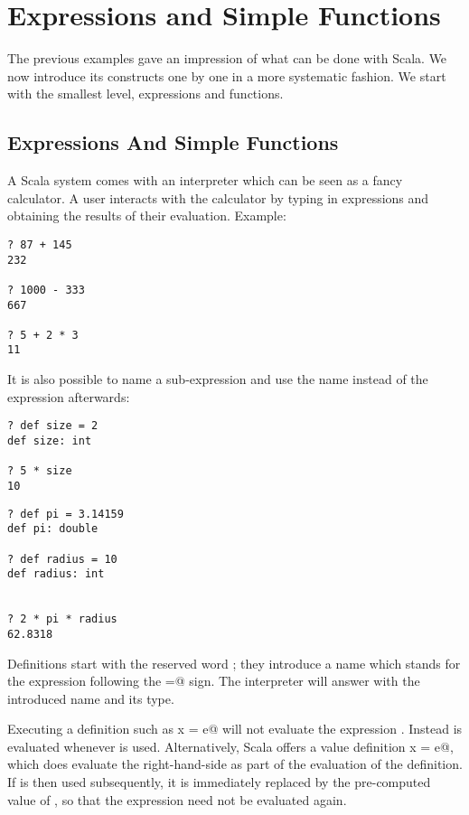 \documentclass[11pt]{book}
\begin{document}
\chapter{\label{chap:simple-funs}Expressions and Simple Functions}

The previous examples gave an impression of what can be done with
Scala.  We now introduce its constructs one by one in a more
systematic fashion. We start with the smallest level, expressions and
functions.

\section{Expressions And Simple Functions}

A Scala system comes with an interpreter which can be seen as a
fancy calculator. A user interacts with the calculator by typing in
expressions and obtaining the results of their evaluation. Example:

\begin{verbatim}
? 87 + 145
232

? 1000 - 333
667

? 5 + 2 * 3
11
\end{verbatim}
It is also possible to name a sub-expression and use the name instead
of the expression afterwards:
\begin{verbatim}
? def size = 2
def size: int

? 5 * size
10
\end{verbatim}
\begin{verbatim}
? def pi = 3.14159
def pi: double

? def radius = 10
def radius: int


? 2 * pi * radius
62.8318
\end{verbatim}
Definitions start with the reserved word \verb@def@; they introduce a
name which stands for the expression following the \verb@=@ sign.  The
interpreter will answer with the introduced name and its type.

Executing a definition such as \verb@def x = e@ will not evaluate the
expression \verb@e@.  Instead \verb@e@ is evaluated whenever \verb@x@
is used. Alternatively, Scala offers a value definition 
\verb@val x = e@, which does evaluate the right-hand-side \verb@e@ as part of the
evaluation of the definition. If \verb@x@ is then used subsequently,
it is immediately replaced by the pre-computed value of
\verb@e@, so that the expression need not be evaluated again.
 
\end{document}
